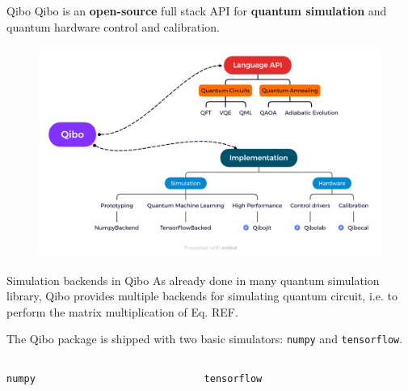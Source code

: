 \documentclass[11p,aspectratio=169]{beamer}
\begin{document}
\begin{frame}{Qibo}
    Qibo is an \textbf{open-source} full stack API for \textbf{quantum simulation} and quantum hardware control and calibration.
    \begin{figure}
        \includegraphics[width= \textwidth]{figures/Qibo.png}
    \end{figure}
    
\end{frame}

\begin{frame}{Simulation backends in Qibo}
    As already done in many quantum simulation library, Qibo provides multiple backends for
    simulating quantum circuit, i.e. to perform the matrix multiplication of Eq. REF.
    
    The Qibo package is shipped with two basic simulators: \texttt{numpy} and \texttt{tensorflow}.
    
    \begin{columns}
        \begin{column}{0.5 \textwidth}
            \texttt{numpy}
        \end{column}
        \begin{column}{0.5 \textwidth}
            \texttt{tensorflow}
        \end{column}
    \end{columns}
\end{frame}
\end{document}
